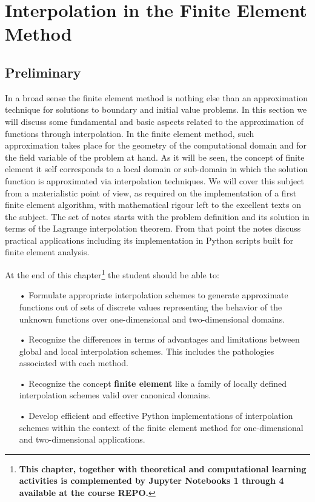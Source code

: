 \graphicspath{ {./img/TheFEM/} }
\chapter{Interpolation in the Finite Element Method}

\section*{Preliminary}
In a broad sense the finite element method is nothing else than an approximation technique for solutions to boundary and initial value problems. In this section we will discuss some fundamental and basic aspects related to the approximation of functions through interpolation. In the finite element method, such approximation takes place for the geometry of the computational domain and for the field variable of the problem at hand. As it will be seen, the concept of finite element it self corresponds to a local domain or sub-domain in which the solution function is approximated via interpolation techniques. We will cover this subject from a materialistic point of view, as required on the implementation of a first finite element algorithm, with mathematical rigour left to the excellent texts on the subject. The set of notes starts with the problem definition and its solution in terms of the Lagrange interpolation theorem. From that point the notes discuss practical applications including its implementation in Python scripts built for finite element analysis. 

At the end of this chapter\footnote{{\bf This chapter, together with theoretical and computational learning activities is complemented by Jupyter Notebooks 1 through 4 available at the course REPO.}} the student should be able to:


\begin{itemize}
\item[•] Formulate appropriate interpolation schemes to generate approximate functions out of sets of discrete values representing the behavior of the unknown functions over one-dimensional and two-dimensional domains.
\item[•] Recognize the differences in terms of advantages and limitations  between global and local interpolation schemes. This includes the pathologies associated with each method.
\item[•] Recognize the concept {\bf finite element} like a family of locally defined interpolation schemes valid over canonical domains.
\item[•] Develop efficient and effective  Python implementations of interpolation schemes within the context of the finite element method for one-dimensional and two-dimensional applications.
\end{itemize}  

